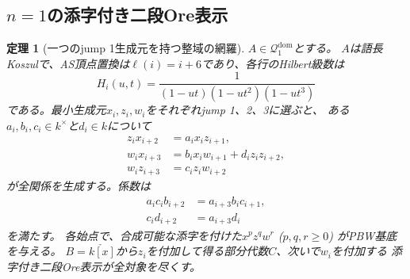 \documentclass[11pt,a4paper]{ltjsarticle}
\newtheorem{theorem}{定理}[section]
\theoremstyle{definition}
\begin{document}
\subsection{$n=1$の添字付き二段Ore表示}
\begin{theorem}[一つのjump 1生成元を持つ整域の網羅]
\label{genidx:thm:one-light-ore}
$A\in\mathcal Q_1^{\mathrm{dom}}$とする。
$A$は語長Koszulで、AS頂点置換は$\ell(i)=i+6$であり、各行のHilbert級数は
\[
H_i(u,t)=\frac1{(1-ut)(1-ut^2)(1-ut^3)}
\]
である。最小生成元$x_i,z_i,w_i$をそれぞれjump 1、2、3に選ぶと、
ある$a_i,b_i,c_i\in k^\times$と$d_i\in k$について
\begin{equation}\label{genidx:eq:one-light-relations}
\begin{aligned}
z_i x_{i+2}&=a_i x_i z_{i+1},\\
w_i x_{i+3}&=b_i x_i w_{i+1}+d_i z_i z_{i+2},\\
w_i z_{i+3}&=c_i z_i w_{i+2}
\end{aligned}
\end{equation}
が全関係を生成する。係数は
\begin{align}
a_i c_i b_{i+2}&=a_{i+3}b_i c_{i+1},\label{genidx:eq:one-light-consistency-one}\\
c_i d_{i+2}&=a_{i+3}d_i\label{genidx:eq:one-light-consistency-two}
\end{align}
を満たす。
各始点で、合成可能な添字を付けた$x^p z^q w^r$ ($p,q,r\geq0$) がPBW基底を与える。
$B=\check{k[x]}$から$z_i$を付加して得る部分代数$C$、次いで$w_i$を付加する
添字付き二段Ore表示が全対象を尽くす。
\end{theorem}
\end{document}
